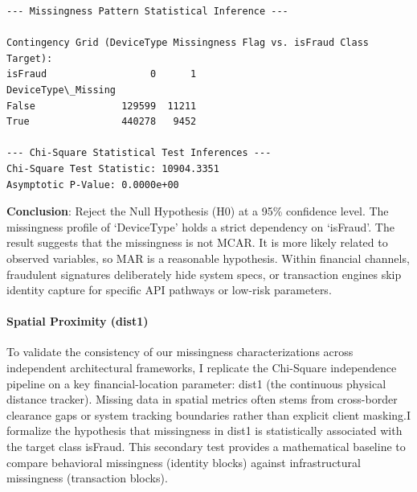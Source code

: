 \documentclass[11pt]{article}
\begin{document}
    \begin{Verbatim}[commandchars=\\\{\}]
--- Missingness Pattern Statistical Inference ---

Contingency Grid (DeviceType Missingness Flag vs. isFraud Class Target):
isFraud                  0      1
DeviceType\_Missing
False               129599  11211
True                440278   9452

--- Chi-Square Statistical Test Inferences ---
Chi-Square Test Statistic: 10904.3351
Asymptotic P-Value: 0.0000e+00
    \end{Verbatim}

    \textbf{Conclusion}: Reject the Null Hypothesis (H0) at a 95\%
confidence level. The missingness profile of `DeviceType' holds a strict
dependency on `isFraud'. The result suggests that the missingness is not
MCAR. It is more likely related to observed variables, so MAR is a
reasonable hypothesis. Within financial channels, fraudulent signatures
deliberately hide system specs, or transaction engines skip identity
capture for specific API pathways or low-risk parameters.

    \paragraph{Spatial Proximity (dist1)}\label{spatial-proximity-dist1}

    To validate the consistency of our missingness characterizations across
independent architectural frameworks, I replicate the Chi-Square
independence pipeline on a key financial-location parameter: dist1 (the
continuous physical distance tracker). Missing data in spatial metrics
often stems from cross-border clearance gaps or system tracking
boundaries rather than explicit client masking.I formalize the
hypothesis that missingness in dist1 is statistically associated with
the target class isFraud. This secondary test provides a mathematical
baseline to compare behavioral missingness (identity blocks) against
infrastructural missingness (transaction blocks).
\end{document}
